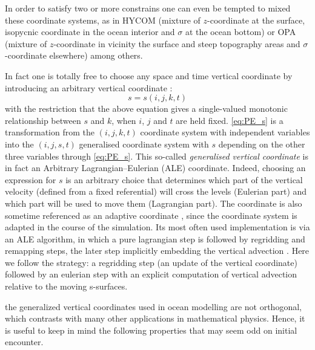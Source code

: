 \documentclass[../main/NEMO_manual]{subfiles}
\begin{document}
In order to satisfy two or more constrains one can even be tempted to mixed these coordinate systems, as in
HYCOM (mixture of $z$-coordinate at the surface, isopycnic coordinate in the ocean interior and $\sigma$ at
the ocean bottom) \citep{Chassignet_al_JPO03} or
OPA (mixture of $z$-coordinate in vicinity the surface and steep topography areas and $\sigma$-coordinate elsewhere)
\citep{Madec_al_JPO96} among others.

In fact one is totally free to choose any space and time vertical coordinate by
introducing an arbitrary vertical coordinate :
\begin{equation}
  \label{eq:PE_s}
  s = s(i,j,k,t)
\end{equation}
with the restriction that the above equation gives a single-valued monotonic relationship between $s$ and $k$,
when $i$, $j$ and $t$ are held fixed.
\autoref{eq:PE_s} is a transformation from the $(i,j,k,t)$ coordinate system with independent variables into
the $(i,j,s,t)$ generalised coordinate system with $s$ depending on the other three variables through
\autoref{eq:PE_s}.
This so-called \textit{generalised vertical coordinate} \citep{Kasahara_MWR74} is in fact
an Arbitrary Lagrangian--Eulerian (ALE) coordinate.
Indeed, choosing an expression for $s$ is an arbitrary choice that determines
which part of the vertical velocity (defined from a fixed referential) will cross the levels (Eulerian part) and
which part will be used to move them (Lagrangian part).
The coordinate is also sometime referenced as an adaptive coordinate \citep{Hofmeister_al_OM09},
since the coordinate system is adapted in the course of the simulation.
Its most often used implementation is via an ALE algorithm,
in which a pure lagrangian step is followed by regridding and remapping steps,
the later step implicitly embedding the vertical advection
\citep{Hirt_al_JCP74, Chassignet_al_JPO03, White_al_JCP09}.
Here we follow the \citep{Kasahara_MWR74} strategy:
a regridding step (an update of the vertical coordinate) followed by an eulerian step with
an explicit computation of vertical advection relative to the moving s-surfaces.

the generalized vertical coordinates used in ocean modelling are not orthogonal,
which contrasts with many other applications in mathematical physics.
Hence, it is useful to keep in mind the following properties that may seem odd on initial encounter.
\end{document}
